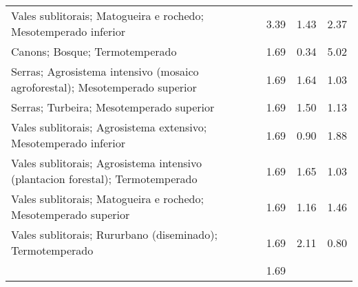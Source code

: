 \begin{table}[p]
\begin{tabular}{lrrr}
  Vales sublitorais; Matogueira e rochedo; Mesotemperado inferior & 3.39 & 1.43 & 2.37 \\ 
  Canons; Bosque; Termotemperado & 1.69 & 0.34 & 5.02 \\ 
  Serras; Agrosistema intensivo (mosaico agroforestal); Mesotemperado superior & 1.69 & 1.64 & 1.03 \\ 
  Serras; Turbeira; Mesotemperado superior & 1.69 & 1.50 & 1.13 \\ 
  Vales sublitorais; Agrosistema extensivo; Mesotemperado inferior & 1.69 & 0.90 & 1.88 \\ 
  Vales sublitorais; Agrosistema intensivo (plantacion forestal); Termotemperado & 1.69 & 1.65 & 1.03 \\ 
  Vales sublitorais; Matogueira e rochedo; Mesotemperado superior & 1.69 & 1.16 & 1.46 \\ 
  Vales sublitorais; Rururbano (diseminado); Termotemperado & 1.69 & 2.11 & 0.80 \\ 
   & 1.69 &  &  \\ 
   \hline
\end{tabular}
\end{table}

